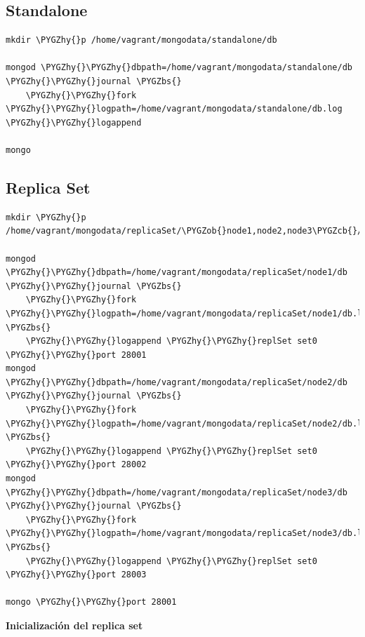 \documentclass[a4paper,10pt,english]{sphinxmanual}
\def\PYGZbs{\char`\\}
\def\PYGZob{\char`\{}
\def\PYGZcb{\char`\}}
\def\PYGZhy{\char`\-}
\begin{document}
\subsection{Standalone}
\label{contents/ejemplosDesplieguesLocal:standalone}
\begin{Verbatim}[commandchars=\\\{\}]
mkdir \PYGZhy{}p /home/vagrant/mongodata/standalone/db

mongod \PYGZhy{}\PYGZhy{}dbpath=/home/vagrant/mongodata/standalone/db \PYGZhy{}\PYGZhy{}journal \PYGZbs{}
    \PYGZhy{}\PYGZhy{}fork \PYGZhy{}\PYGZhy{}logpath=/home/vagrant/mongodata/standalone/db.log \PYGZhy{}\PYGZhy{}logappend

mongo
\end{Verbatim}


\subsection{Replica Set}
\label{contents/ejemplosDesplieguesLocal:replica-set}
\begin{Verbatim}[commandchars=\\\{\}]
mkdir \PYGZhy{}p /home/vagrant/mongodata/replicaSet/\PYGZob{}node1,node2,node3\PYGZcb{}/db

mongod \PYGZhy{}\PYGZhy{}dbpath=/home/vagrant/mongodata/replicaSet/node1/db \PYGZhy{}\PYGZhy{}journal \PYGZbs{}
    \PYGZhy{}\PYGZhy{}fork \PYGZhy{}\PYGZhy{}logpath=/home/vagrant/mongodata/replicaSet/node1/db.log \PYGZbs{}
    \PYGZhy{}\PYGZhy{}logappend \PYGZhy{}\PYGZhy{}replSet set0 \PYGZhy{}\PYGZhy{}port 28001
mongod \PYGZhy{}\PYGZhy{}dbpath=/home/vagrant/mongodata/replicaSet/node2/db \PYGZhy{}\PYGZhy{}journal \PYGZbs{}
    \PYGZhy{}\PYGZhy{}fork \PYGZhy{}\PYGZhy{}logpath=/home/vagrant/mongodata/replicaSet/node2/db.log \PYGZbs{}
    \PYGZhy{}\PYGZhy{}logappend \PYGZhy{}\PYGZhy{}replSet set0 \PYGZhy{}\PYGZhy{}port 28002
mongod \PYGZhy{}\PYGZhy{}dbpath=/home/vagrant/mongodata/replicaSet/node3/db \PYGZhy{}\PYGZhy{}journal \PYGZbs{}
    \PYGZhy{}\PYGZhy{}fork \PYGZhy{}\PYGZhy{}logpath=/home/vagrant/mongodata/replicaSet/node3/db.log \PYGZbs{}
    \PYGZhy{}\PYGZhy{}logappend \PYGZhy{}\PYGZhy{}replSet set0 \PYGZhy{}\PYGZhy{}port 28003

mongo \PYGZhy{}\PYGZhy{}port 28001
\end{Verbatim}

\textbf{Inicialización del replica set}
\end{document}
